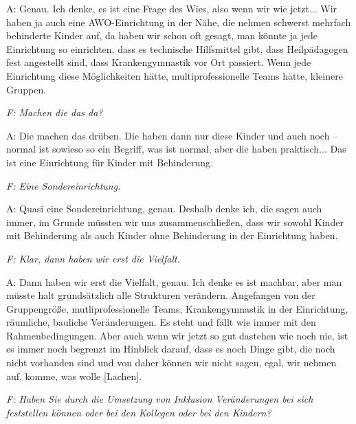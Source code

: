 \begin{linenumbers*}
A: Genau. Ich denke, es ist eine Frage des Wies, also wenn wir wie jetzt... Wir haben ja auch eine AWO-Einrichtung in der Nähe, die nehmen schwerst mehrfach behinderte Kinder auf, da haben wir schon oft gesagt, man könnte ja jede Einrichtung so einrichten, dass es technische Hilfsmittel gibt, dass Heilpädagogen fest angestellt sind, dass Krankengymnastik vor Ort passiert. Wenn jede Einrichtung diese Möglichkeiten hätte, multiprofessionelle Teams hätte, kleinere Gruppen. 

\emph{F: Machen die das da?}

A: Die machen das drüben. Die haben dann nur diese Kinder und auch noch -- normal ist sowieso so ein Begriff, was ist normal, aber die haben praktisch... Das ist eine Einrichtung für Kinder mit Behinderung. 

\emph{F: Eine Sondereinrichtung.}

A: Quasi eine Sondereinrichtung, genau.
Deshalb denke ich, die sagen auch immer, im Grunde müssten wir uns zusammenschließen, dass wir sowohl Kinder mit Behinderung als auch Kinder ohne Behinderung in der Einrichtung haben.

\emph{F: Klar, dann haben wir erst die Vielfalt.}

A: Dann haben wir erst die Vielfalt, genau. Ich denke es ist machbar, aber man müsste halt grundsätzlich alle Strukturen verändern. Angefangen von der Gruppengröße, mutliprofessionelle Teams, Krankengymnastik in der Einrichtung, räumliche, bauliche Veränderungen. Es steht und fällt wie immer mit den Rahmenbedingungen. 
Aber auch wenn wir jetzt so gut dastehen wie noch nie, ist es immer noch begrenzt im Hinblick darauf, dass es noch Dinge gibt, die noch nicht vorhanden sind und von daher können wir nicht sagen, egal, wir nehmen auf, komme, was wolle {[Lachen]}.

\emph{F: Haben Sie durch die Umsetzung von Inklusion Veränderungen bei sich feststellen können oder bei den Kollegen oder bei den Kindern?} 


\end{linenumbers*}
